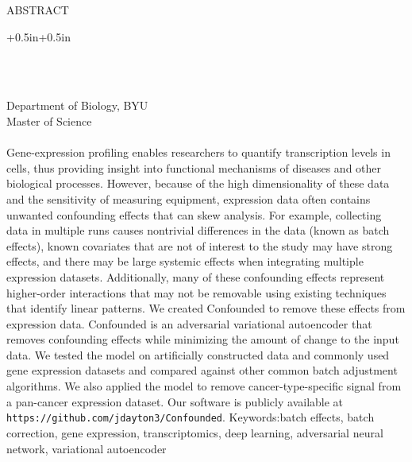\documentclass[12pt]{article}
\begin{document}
\begin{titlingpage}
	\setcounter{page}{2}
	\begin{center}
		ABSTRACT\\
		\vspace{1em}
		\begin{adjustwidth}{+0.5in}{+0.5in}
			\begin{center}
				\thetitle\\
			\end{center}
		\end{adjustwidth}
		\vspace{1em}
		\theauthor\\
		Department of Biology, BYU\\
		Master of Science
	\end{center}
		\paragraph{} %
		Gene-expression profiling enables researchers to quantify transcription levels in cells, thus providing insight into functional mechanisms of diseases and other biological processes.
		However, because of the high dimensionality of these data and the sensitivity of measuring equipment, expression data often contains unwanted confounding effects that can skew analysis.
		For example, collecting data in multiple runs causes nontrivial differences in the data (known as batch effects),
		known covariates that are not of interest to the study may have strong effects,
		and there may be large systemic effects when integrating multiple expression datasets.
		Additionally, many of these confounding effects represent higher-order interactions that may not be removable using existing techniques that identify linear patterns.
		We created Confounded to remove these effects from expression data.
		Confounded is an adversarial variational autoencoder that removes confounding effects while minimizing the amount of change to the input data.
		We tested the model on artificially constructed data and commonly used gene expression datasets and compared against other common batch adjustment algorithms.
		We also applied the model to remove cancer-type-specific signal from a pan-cancer expression dataset.
		Our software is publicly available at \nolinkurl{https://github.com/jdayton3/Confounded}.
	\vfill
	\noindent
	Keywords:\@ batch effects, batch correction, gene expression, transcriptomics, deep learning, adversarial neural network, variational autoencoder %
\end{titlingpage}
\end{document}
